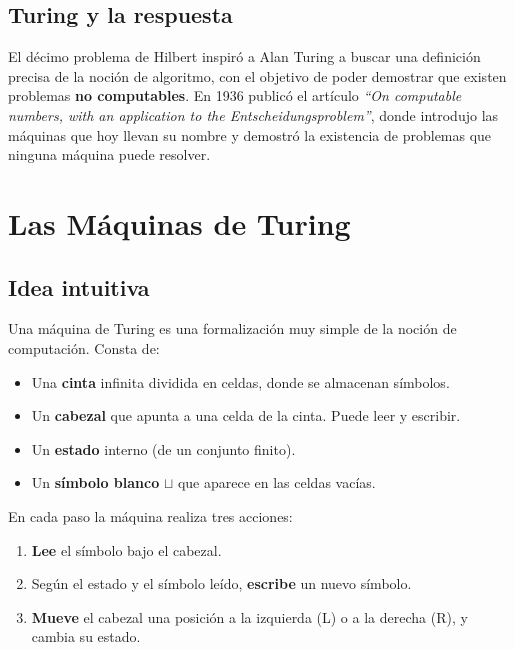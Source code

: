 \documentclass[11pt,a4paper]{article}
\theoremstyle{definicion}
\newcommand{\bl}{\sqcup}
\begin{document}
\subsection{Turing y la respuesta}

El décimo problema de Hilbert inspiró a Alan Turing a buscar una definición precisa de la noción de algoritmo, con el objetivo de poder demostrar que existen problemas \textbf{no computables}. En 1936 publicó el artículo \emph{``On computable numbers, with an application to the Entscheidungsproblem''}, donde introdujo las máquinas que hoy llevan su nombre y demostró la existencia de problemas que ninguna máquina puede resolver.

\section{Las Máquinas de Turing}

\subsection{Idea intuitiva}

Una máquina de Turing es una formalización muy simple de la noción de computación. Consta de:

\begin{itemize}
    \item Una \textbf{cinta} infinita dividida en celdas, donde se almacenan símbolos.
    \item Un \textbf{cabezal} que apunta a una celda de la cinta. Puede leer y escribir.
    \item Un \textbf{estado} interno (de un conjunto finito).
    \item Un \textbf{símbolo blanco} $\bl$ que aparece en las celdas vacías.
\end{itemize}

\begin{center}
\end{center}

En cada paso la máquina realiza tres acciones:
\begin{enumerate}
    \item \textbf{Lee} el símbolo bajo el cabezal.
    \item Según el estado y el símbolo leído, \textbf{escribe} un nuevo símbolo.
    \item \textbf{Mueve} el cabezal una posición a la izquierda (L) o a la derecha (R), y cambia su estado.
\end{enumerate}
\end{document}
